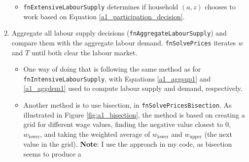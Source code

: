 \begin{enumerate}
\begin{itemize}
        \item \texttt{fnExtensiveLabourSupply} determines if household $(a,z)$ chooses to work based on Equation \eqref{a1_participation_decision}.  
    \end{itemize}
    \item Aggregate all labour supply decisions (\texttt{fnAggregateLabourSupply}) and compare them with the aggregate labour demand.
    \texttt{fnSolvePrices} iterates $w$ and $T$ until both clear the labour market. 
    \begin{itemize}
        \item One way of doing that is following the same method as for \texttt{fnIntensiveLabourSupply}, with Equations \eqref{a1_aggsup1} and \eqref{a1_aggdem1} used to compute labour supply and demand, respectively. 
        \item Another method is to use bisection, in \texttt{fnSolvePricesBisection}. 
        As illustrated in Figure \ref{fig:a1_bisection}, the method is based on creating a grid for different wage values, finding the negative value closest to $0$, $w_{\text{lower}}$, and taking the weighted average of $w_{\text{lower}}$ and $w_{\text{upper}}$ (the next value in the grid).
        \textbf{Note}: I use the  approach in my code, as bisection seems to produce a 
    \end{itemize}   
\end{enumerate}

